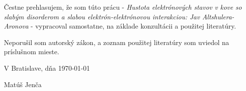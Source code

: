 \thispagestyle{empty}
\vskip 5cm
Čestne prehlasujem, že som túto prácu - {\it Hustota elektrónových stavov v kove so slabým disorderom a slabou elektrón-elektrónovou interakciou:  Jav Altshulera-Aronova} - vypracoval samostatne, na základe konzultácii a použitej literatúry.

Neporušil som autorský zákon, a zoznam použitej literatúry som uviedol na príslušnom mieste.

\vskip 2cm
V Bratislave, dňa \today
\vskip 2cm

\begin{flushright}
Matúš Jenča
\end{flushright}
